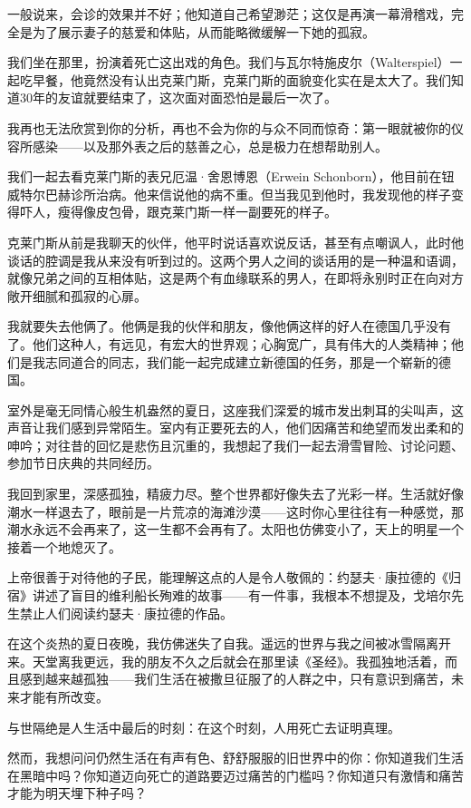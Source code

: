 \documentclass[UTF8]{ctexart}
\begin{document}
一般说来，会诊的效果并不好；他知道自己希望渺茫；这仅是再演一幕滑稽戏，完全是为了展示妻子的慈爱和体贴，从而能略微缓解一下她的孤寂。

我们坐在那里，扮演着死亡这出戏的角色。我们与瓦尔特施皮尔（Walterspiel）一起吃早餐，他竟然没有认出克莱门斯，克莱门斯的面貌变化实在是太大了。我们知道30年的友谊就要结束了，这次面对面恐怕是最后一次了。

我再也无法欣赏到你的分析，再也不会为你的与众不同而惊奇：第一眼就被你的仪容所感染——以及那外表之后的慈善之心，总是极力在想帮助别人。

我们一起去看克莱门斯的表兄厄温·舍恩博恩（Erwein Schonborn），他目前在钮威特尔巴赫诊所治病。他来信说他的病不重。但当我见到他时，我发现他的样子变得吓人，瘦得像皮包骨，跟克莱门斯一样一副要死的样子。

克莱门斯从前是我聊天的伙伴，他平时说话喜欢说反话，甚至有点嘲讽人，此时他谈话的腔调是我从来没有听到过的。这两个男人之间的谈话用的是一种温和语调，就像兄弟之间的互相体贴，这是两个有血缘联系的男人，在即将永别时正在向对方敞开细腻和孤寂的心扉。

我就要失去他俩了。他俩是我的伙伴和朋友，像他俩这样的好人在德国几乎没有了。他们这种人，有远见，有宏大的世界观；心胸宽广，具有伟大的人类精神；他们是我志同道合的同志，我们能一起完成建立新德国的任务，那是一个崭新的德国。

室外是毫无同情心般生机盎然的夏日，这座我们深爱的城市发出刺耳的尖叫声，这声音让我们感到异常陌生。室内有正要死去的人，他们因痛苦和绝望而发出柔和的呻吟；对往昔的回忆是悲伤且沉重的，我想起了我们一起去滑雪冒险、讨论问题、参加节日庆典的共同经历。

我回到家里，深感孤独，精疲力尽。整个世界都好像失去了光彩一样。生活就好像潮水一样退去了，眼前是一片荒凉的海滩沙漠——这时你心里往往有一种感觉，那潮水永远不会再来了，这一生都不会再有了。太阳也仿佛变小了，天上的明星一个接着一个地熄灭了。

上帝很善于对待他的子民，能理解这点的人是令人敬佩的：约瑟夫·康拉德的《归宿》讲述了盲目的维利船长殉难的故事——有一件事，我根本不想提及，戈培尔先生禁止人们阅读约瑟夫·康拉德的作品。

在这个炎热的夏日夜晚，我仿佛迷失了自我。遥远的世界与我之间被冰雪隔离开来。天堂离我更远，我的朋友不久之后就会在那里读《圣经》。我孤独地活着，而且感到越来越孤独——我们生活在被撒旦征服了的人群之中，只有意识到痛苦，未来才能有所改变。

与世隔绝是人生活中最后的时刻：在这个时刻，人用死亡去证明真理。

然而，我想问问仍然生活在有声有色、舒舒服服的旧世界中的你：你知道我们生活在黑暗中吗？你知道迈向死亡的道路要迈过痛苦的门槛吗？你知道只有激情和痛苦才能为明天埋下种子吗？
\end{document}
